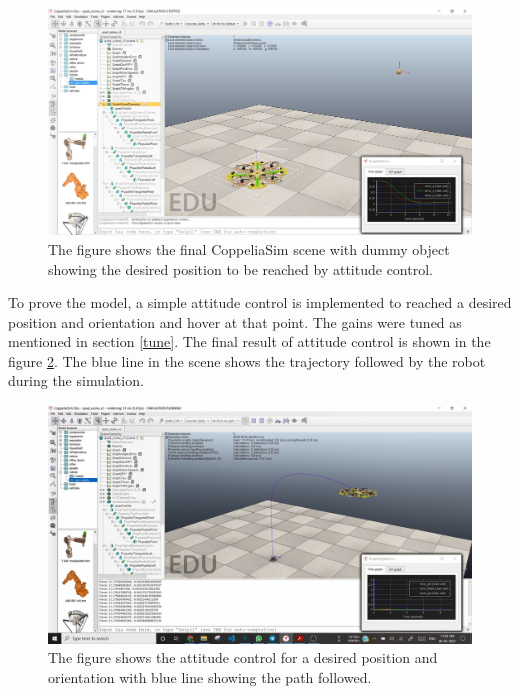 \documentclass[a4paper, 12pt, oneside]{book}
\begin{document}
\begin{figure}[H]
    \begin{center}
        \includegraphics[width=.95\linewidth]{figures/finalScene.JPG}
        \caption{The figure shows the final CoppeliaSim scene with dummy object showing the desired position to be reached by attitude control.}
        \label{fig:finalScene}
    \end{center}
\end{figure}

To prove the model, a simple attitude control is implemented to reached a desired position and orientation and hover at that point. The gains were tuned as mentioned in section \ref{tune}. The final result of attitude control is shown in the figure \ref{fig:attitudeControl}. The blue line in the scene shows the trajectory followed by the robot during the simulation. \\

\begin{figure}[H]
    \begin{center}
        \includegraphics[width=.95\linewidth]{figures/goalReach.JPG}
        \caption{The figure shows the attitude control for a desired position and orientation with blue line showing the path followed.}
        \label{fig:attitudeControl}
    \end{center}
\end{figure}
\end{document}
